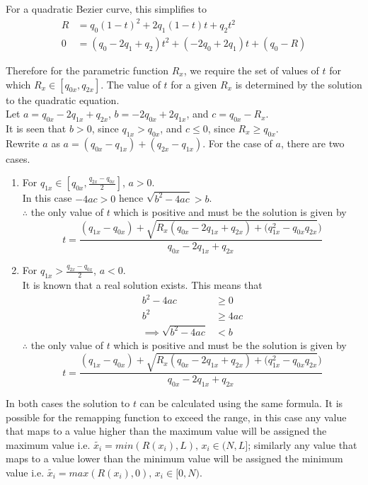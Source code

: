 \begin{definition}
	For a quadratic Bezier curve, this simplifies to
	\begin{align*}
		R &= q_0(1-t)^2 + 2q_1(1-t)t + q_2t^2 \\
		0 &= (q_0-2q_1+q_2)t^2 + (-2q_0+2q_1)t + (q_0-R)
	\end{align*}
	
	Therefore for the parametric function $R_x$, we require the set of values of $t$ for which $R_x \in [q_{0x},q_{2x}]$. The value of $t$ for a given $R_x$ is determined by the solution to the quadratic equation.\\
	Let $a=q_{0x}-2q_{1x}+q_{2x}$, $b=-2q_{0x}+2q_{1x}$, and $c=q_{0x}-R_x$.\\
	It is seen that $b>0$, since $q_{1x} > q_{0x}$, and $c \leq 0$, since $R_x \geq q_{0x}$.\\
	Rewrite $a$ as $a=(q_{0x}-q_{1x}) + (q_{2x}-q_{1x})$.
	For the case of $a$, there are two cases.
	
	\begin{enumerate}
		\item
		For $q_{1x} \in [q_{0x}, \frac{q_{2x}-q_{0x}}{2}]$, $a>0$.\\
		In this case $-4ac>0$ hence $\sqrt{b^2-4ac}>b$.\\
		$\therefore$ the only value of $t$ which is positive and must be the solution is given by
		\begin{equation}\label{eq:qt1}
			t =  \frac{(q_{1x}-q_{0x}) + \sqrt{R_x(q_{0x}-2q_{1x}+q_{2x})+(q_{1x}^2-q_{0x}q_{2x}})}{q_{0x}-2q_{1x}+q_{2x}}
		\end{equation}

		\item
		For $q_{1x}>\frac{q_{2x}-q_{0x}}{2}$, $a<0$.\\
		It is known that a real solution exists. This means that
		\begin{align*}
			b^2 -4ac &\geq 0 \\
			b^2 &\geq 4ac \\
			\implies \sqrt{b^2-4ac} &< b
		\end{align*}
		$\therefore$ the only value of $t$ which is positive and must be the solution is given by
		\begin{equation}\label{eq:qt2}
			t =  \frac{(q_{1x}-q_{0x}) + \sqrt{R_x(q_{0x}-2q_{1x}+q_{2x})+(q_{1x}^2-q_{0x}q_{2x}})}{q_{0x}-2q_{1x}+q_{2x}}
		\end{equation}
	\end{enumerate}

	In both cases the solution to $t$ can be calculated using the same formula.
	It is possible for the remapping function to exceed the range, in this case any value that maps to a value higher than the maximum value will be assigned the maximum value i.e. $\widetilde{x_i} = min(R(x_i),L), \,  x_i \in (N,L]$; similarly any value that maps to a value lower than the minimum value will be assigned the minimum value i.e. $\widetilde{x_i} = max(R(x_i),0), \, x_i \in [0,N)$.
\end{definition}

